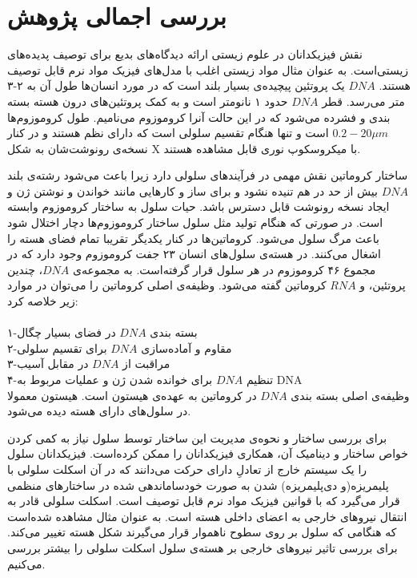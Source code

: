\setRL
\section{بررسی اجمالی پژوهش}


نقش فیزیکدانان در علوم زیستی ارائه دیدگاه‌های بدیع برای توصیف پدیده‌های زیستی‌است. به عنوان مثال مواد زیستی اغلب با مدل‌های فیزیک مواد نرم قابل توصیف هستند. $DNA$ یک پروتئین پیچیده‌ی بسیار بلند است که در مورد انسان‌ها طول آن به ۲-۳ متر می‌رسد\cite{Kauffman:1999yu}. قطر $DNA$ حدود ۱ نانومتر است\cite{WATSON:1953fr} و به کمک پروتئین‌های درون هسته بسته بندی و فشرده می‌شود که در این حالت آنرا کروموزوم می‌نامیم. طول کروموزوم‌ها $0.2-20\mu m$ است و تنها هنگام تقسیم سلولی است که دارای نظم هستند و در کنار نسخه‌ی رونوشت‌شان به شکل X‌ با میکروسکوپ نوری قابل مشاهده هستند\cite{CHAFFEY:2003cr}. 

 ساختار کروماتین نقش مهمی در فرآیندهای سلولی دارد زیرا باعث می‌شود رشته‌ی بلند $DNA$ بیش از حد در هم تنیده نشود و برای ساز و کار‌هایی مانند خواندن و نوشتن ژن و ایجاد نسخه رونوشت قابل دسترس باشد\cite{PhysRevLett.120.088101, CHAFFEY:2003fv}. حیات سلول به ساختار کروموزوم وابسته است. در صورتی که هنگام تولید مثل سلول ساختار کروموزوم‌ها دچار اختلال شود باعث مرگ سلول می‌شود. 
 کروماتین‌ها در کنار یکدیگر تقریبا تمام فضای هسته را اشغال می‌کنند. در هسته‌ی سلول‌های انسان ۲۳ جفت کروموزوم وجود دارد که در مجموع ۴۶ کروموزوم در هر سلول قرار گرفته‌است.  به مجموعه‌ی $DNA$، چندین پروتئین، و $RNA$ کروماتین گفته می‌شود. وظیفه‌ی اصلی کروماتین را می‌توان در موارد زیر خلاصه کرد:\\\\
۱-بسته بندی $DNA$ در فضای بسیار چگال\\
۲-مقاوم و آماده‌سازی $DNA$ برای تقسیم سلولی\\
۳-مراقبت از $DNA$ در مقابل آسیب\\
۴-تنظیم $DNA$ برای خوانده شدن ژن و عملیات مربوط به DNA\\

وظیفه‌ی اصلی بسته بندی $DNA$ در کروماتین به عهده‌ی هیستون است\cite{Hammond:2017sp}. هیستون معمولا در سلول‌های دارای هسته دیده می‌شود.

 برای بررسی ساختار و نحوه‌ی مدیریت این ساختار توسط سلول نیاز به کمی کردن  خواص ساختار و دینامیک آن، همکاری فیزیکدانان را ممکن کرده‌است. فیزیکدانان سلول  را یک سیستم خارج از تعادلِ دارای حرکت
می‌دانند که در آن اسکلت سلولی با پلیمریزه(و دی‌پلیمریزه) شدن به صورت خودساماندهی‌ شده در ساختار‌های منظمی  قرار می‌گیرد که با قوانین فیزیک مواد نرم قابل توصیف است.\cite{Caballero:2015ty} اسکلت سلولی قادر به انتقال نیروهای خارجی به اعضای داخلی هسته است. به عنوان مثال مشاهده‌ شده‌است که هنگامی که سلول بر روی سطوح ناهموار قرار می‌گیرند شکل هسته تغییر می‌کند\cite{Heydari:2017cy}. برای بررسی تاثیر نیروهای خارجی بر هسته‌ی سلول اسکلت سلولی را بیشتر بررسی می‌کنیم.

